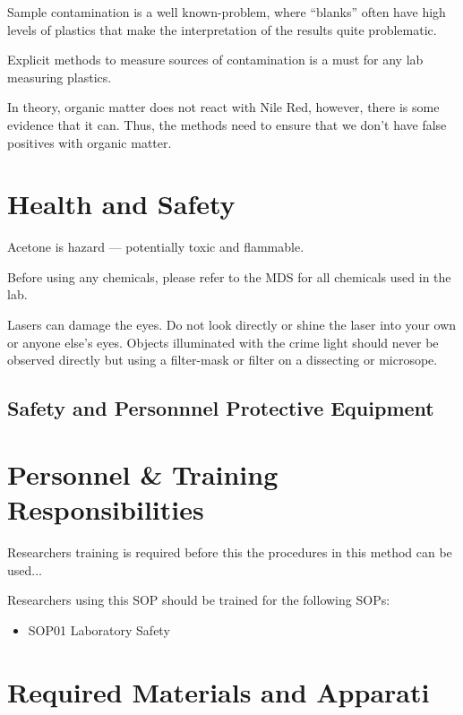 \documentclass[12pt]{../SOP4_alpha}\usepackage[]{graphicx}\usepackage[]{color}
\begin{document}
\NP Sample contamination is a well known-problem, where ``blanks'' often have high levels of plastics that make the interpretation of the results quite problematic. 

\NP Explicit methods to measure sources of contamination is a must for any lab measuring plastics. 

\NP In theory, organic matter does not react with Nile Red, however, there is some evidence that it can. Thus, the methods need to ensure that we don't have false positives with organic matter. 

\section{Health and Safety}

\NP Acetone is hazard --- potentially toxic and flammable. 

\NP Before using any chemicals, please refer to the MDS for all chemicals used in the lab. 

\NP Lasers can damage the eyes. Do not look directly or shine the laser into your own or anyone else's eyes. Objects illuminated with the crime light should never be observed directly but using a filter-mask or filter on a dissecting or microsope. 

\subsection{Safety and Personnnel Protective Equipment}

\section{Personnel \& Training Responsibilities}

\NP Researchers training is required before this the procedures in this method can be used... 

\NP Researchers using this SOP should be trained for the following SOPs:

\begin{itemize}
  \item SOP01 Laboratory Safety
\end{itemize}

\section{Required Materials and Apparati}
\end{document}
